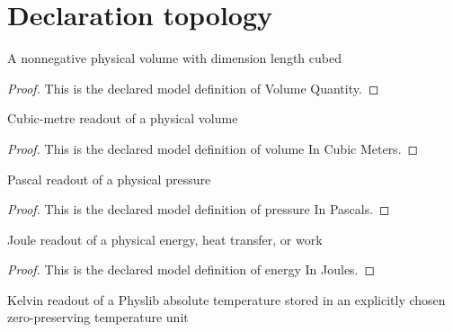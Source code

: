 \section{Declaration topology}
\begin{definition}
  \label{def:physics:phyx-mini-0354:phyxminiproblems-problemphyxmini0354-volumequantity}
  A nonnegative physical volume with dimension length cubed
\end{definition}
\begin{proof}
  This is the declared model definition of Volume Quantity.
\end{proof}
\begin{definition}
  \label{def:physics:phyx-mini-0354:phyxminiproblems-problemphyxmini0354-volumeincubicmeters}
  Cubic-metre readout of a physical volume
\end{definition}
\begin{proof}
  This is the declared model definition of volume In Cubic Meters.
\end{proof}
\begin{definition}
  \label{def:physics:phyx-mini-0354:phyxminiproblems-problemphyxmini0354-pressureinpascals}
  Pascal readout of a physical pressure
\end{definition}
\begin{proof}
  This is the declared model definition of pressure In Pascals.
\end{proof}
\begin{definition}
  \label{def:physics:phyx-mini-0354:phyxminiproblems-problemphyxmini0354-energyinjoules}
  Joule readout of a physical energy, heat transfer, or work
\end{definition}
\begin{proof}
  This is the declared model definition of energy In Joules.
\end{proof}
\begin{definition}
  \label{def:physics:phyx-mini-0354:phyxminiproblems-problemphyxmini0354-temperatureinkelvin}
  Kelvin readout of a Physlib absolute temperature stored in an explicitly chosen zero-preserving temperature unit
\end{definition}
